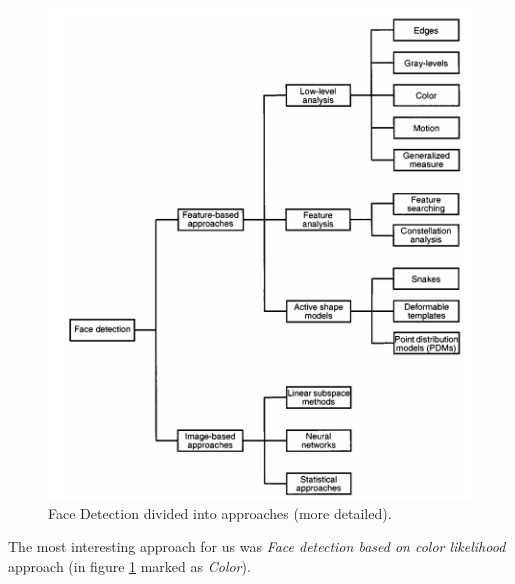 \documentclass[Bachelorarbeit.tex]{subfiles}
\begin{document}
\begin{figure}[!h] %
\centering
\includegraphics[scale=1]{./pictures/FaceDetectionApproaches}
\caption{Face Detection divided into approaches (more detailed). \label{FDaS}}
\end{figure}

The most interesting approach for us was \textit{Face detection based on color likelihood} approach (in figure \ref{FDaS} marked as \textit{Color}).
\end{document}
